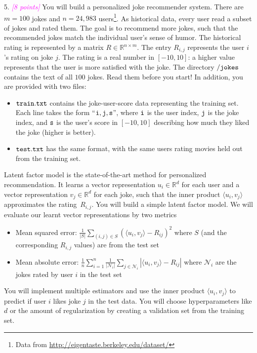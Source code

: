 \documentclass{article}
\newcommand{\field}[1]{\mathbb{#1}}
\newcommand{\1}{\mathbf{1}}
\newcommand{\R}{\field{R}} %
\newcommand{\grade}[1]{\small\textcolor{magenta}{\emph{[#1 points]}} \normalsize}
\begin{document}
5. \grade{8} You will build a personalized joke recommender system. There are $m = 100$ jokes and $n = 24,983$ users\footnote{Data from \url{http://eigentaste.berkeley.edu/dataset/}}. As historical data, every user read a subset of jokes and rated them. The goal is to recommend more jokes, such that the recommended jokes match the individual user's sense of humor.
The historical rating is represented by a matrix $R\in \R^{n \times m}$. The entry $R_{i,j}$ represents the user $i$'s rating on joke $j$. The rating is a real number in $[-10,10]$: a higher value represents that the user is more satisfied with the joke.
The directory $\tt /jokes$ contains the text of all $100$ jokes. Read them before you start! In addition, you are provided with two files:
\begin{itemize}
\item $\tt train.txt$ contains the joke-user-score data representing the training set. Each line takes the form ``$\tt i,j,s$'', where $\tt i$ is the user index, $\tt j$ is the joke index, and $\tt s$ is the user's score in $[-10,10]$ describing how much they liked the joke (higher is better).
\item $\tt test.txt$ has the same format, with the same users rating movies held out from the training set.
\end{itemize}

Latent factor model is the state-of-the-art method for personalized recommendation. It learns a vector representation $u_i\in \R^d$ for each user and a vector representation $v_j\in \R^d$ for each joke, such that
the inner product $\langle u_i,v_j\rangle$ approximates the rating~$R_{i,j}$. You will build a simple latent factor model.
We will evaluate our learnt vector representations by two metrics
\begin{itemize}
  \item Mean squared error: $\frac{1}{|S|} \sum_{(i,j)\in S} (\langle u_i,v_j\rangle - R_{ij})^2$ where $S$ (and the corresponding $R_{i,j}$ values) are from the test set
  \item Mean absolute error: $\frac{1}{n} \sum_{i=1}^n \frac{1}{|\mathcal{N}_i|} \sum_{j \in \mathcal{N}_i} |\langle u_i,v_j\rangle - R_{ij}|$ where $\mathcal{N}_i$ are the jokes rated by user $i$ in the test set
\end{itemize}  

You will implement multiple estimators and use the inner product $\langle u_i,v_j\rangle$ to predict if user $i$ likes joke $j$ in the test data.
You will choose hyperparameters like $d$ or the amount of regularization by creating a validation set from the training set.
\end{document}
